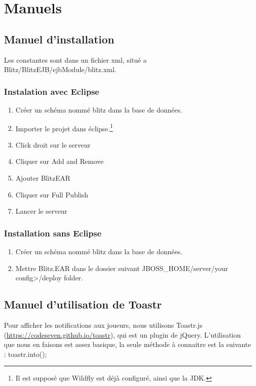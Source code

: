 \documentclass[11pt]{scrreprt}
\begin{document}
    \chapter{Manuels}
    \section{Manuel d'installation}
    Les constantes sont dans un fichier xml, situé a Blitz/BlitzEJB/ejbModule/blitz.xml.

    \subsection{Instalation avec Eclipse}
    \begin{enumerate}
        \item Créer un schéma nommé \og blitz\fg{} dans la base de données.
        \item Importer le projet dans éclipse.\footnote{Il est supposé que Wildfly est déjà configuré, ainsi que la JDK.}
        \item Click droit sur le serveur
        \item Cliquer sur \og Add and Remove\fg{}
        \item Ajouter \og BlitzEAR\fg{}
        \item Cliquer sur \og Full Publish\fg{}
        \item Lancer le serveur
    \end{enumerate}
    \subsection{Installation sans Eclipse}
    \begin{enumerate}
        \item Créer un schéma nommé \og blitz\fg{} dans la base de données.
        \item Mettre Blitz.EAR dans le dossier suivant JBOSS\_HOME/server/your config>/deploy folder.
    \end{enumerate}

    \section{Manuel d'utilisation de Toastr}
    Pour afficher les notifications aux joueurs, nous utilisons Toastr.js (\url{https://codeseven.github.io/toastr}), qui est un plugin de jQuery. L'utilisation que nous en faisons est assez basique, la seule méthode à connaitre est la suivante : toastr.into();
\end{document}
